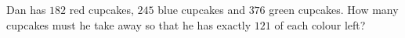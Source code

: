 Dan has $182$ red cupcakes, $245$ blue cupcakes and $376$ green cupcakes. How many cupcakes must he take away so that he has exactly $121$ of each colour left?
